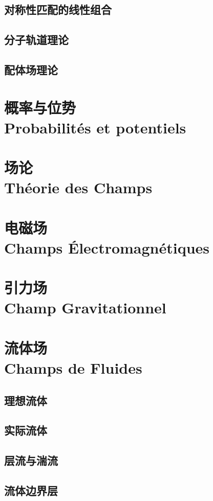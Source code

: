 \documentclass[12pt, a4paper, oneside]{ctexbook}
\begin{document}
\section{对称性匹配的线性组合}
\section{分子轨道理论}
\section{配体场理论}
\chapter{概率与位势\\ Probabilités et potentiels}  
\chapter{场论\\ Théorie des Champs} 
\chapter{电磁场\\Champs Électromagnétiques}
\chapter{引力场\\ Champ Gravitationnel}
\chapter{流体场\\Champs de Fluides}
  \section{理想流体}
  \section{实际流体}
  \section{层流与湍流}
  \section{流体边界层}








\ifx\allfiles\undefined
\end{document}
